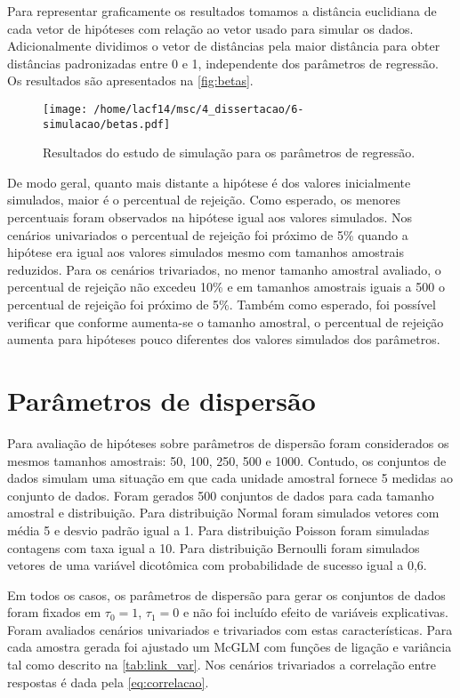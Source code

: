 Para representar graficamente os resultados tomamos a distância euclidiana de cada vetor de hipóteses com relação ao vetor usado para simular os dados. Adicionalmente dividimos o vetor de distâncias pela maior distância para obter distâncias padronizadas entre 0 e 1, independente dos parâmetros de regressão. Os resultados são apresentados na \autoref{fig:betas}.

\begin{figure}[H]
\centering
\texttt{[image: /home/lacf14/msc/4\_dissertacao/6-simulacao/betas.pdf]}
\caption{Resultados do estudo de simulação para os parâmetros de regressão.}
\label{fig:betas}
\end{figure}

De modo geral, quanto mais distante a hipótese é dos valores inicialmente simulados, maior é o percentual de rejeição. Como esperado, os menores percentuais foram observados na hipótese igual aos valores simulados. Nos cenários univariados o percentual de rejeição foi próximo de 5\% quando a hipótese era igual aos valores simulados mesmo com tamanhos amostrais reduzidos. Para os cenários trivariados, no menor tamanho amostral avaliado, o percentual de rejeição não excedeu 10\% e em tamanhos amostrais iguais a 500 o percentual de rejeição foi próximo de 5\%. Também como esperado, foi possível verificar que conforme aumenta-se o tamanho amostral, o percentual de rejeição aumenta para hipóteses pouco diferentes dos valores simulados dos parâmetros.

\section{Parâmetros de dispersão}

Para avaliação de hipóteses sobre parâmetros de dispersão foram considerados os mesmos tamanhos amostrais: 50, 100, 250, 500 e 1000. Contudo, os conjuntos de dados simulam uma situação em que cada unidade amostral fornece 5 medidas ao conjunto de dados. Foram gerados 500 conjuntos de dados para cada tamanho amostral e distribuição. Para distribuição Normal foram simulados vetores com média 5 e desvio padrão igual a 1. Para distribuição Poisson foram simuladas contagens com taxa igual a 10. Para distribuição Bernoulli foram simulados vetores de uma variável dicotômica com probabilidade de sucesso igual a 0,6.

Em todos os casos, os parâmetros de dispersão para gerar os conjuntos de dados foram fixados em $\tau_0 = 1$, $\tau_1 = 0$ e não foi incluído efeito de variáveis explicativas. Foram avaliados cenários univariados e trivariados com estas características. Para cada amostra gerada foi ajustado um McGLM com funções de ligação e variância tal como descrito na \autoref{tab:link_var}. Nos cenários trivariados a correlação entre respostas é dada pela \autoref{eq:correlacao}.

